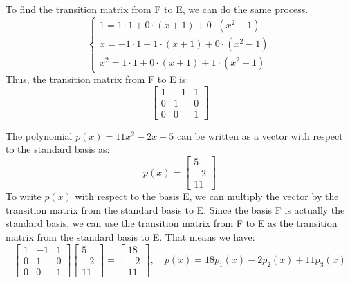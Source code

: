 \documentclass{article}
\begin{document}
\noindent To find the transition matrix from F to E, we can do the same process.
$$
\begin{cases} 1 = 1 \cdot 1 + 0 \cdot (x + 1) + 0 \cdot (x^2 - 1) \\ 
    x = -1 \cdot 1 + 1 \cdot (x + 1) + 0 \cdot (x^2 - 1) \\ 
    x^2 = 1 \cdot 1 + 0 \cdot (x + 1) + 1 \cdot (x^2 - 1)
\end{cases}
$$
Thus, the transition matrix from F to E is:
$$ \begin{bmatrix} 1 & -1 & 1 \\ 0 & 1 & 0 \\ 0 & 0 & 1 \end{bmatrix} $$

\noindent The polynomial $p(x) = 11x^2 - 2x + 5$ can be written as a vector with respect to the standard basis as:
$$ p(x) = \begin{bmatrix} 5 \\ -2 \\ 11 \end{bmatrix} $$
\noindent To write $p(x)$ with respect to the basis E, we can multiply the vector by the transition matrix from the standard basis to E.
Since the basis F is actually the standard basis, we can use the transition matrix from F to E as the transition matrix from the standard basis to E.
That means we have:
$$ 
\begin{bmatrix} 1 & -1 & 1 \\ 0 & 1 & 0 \\ 0 & 0 & 1 \end{bmatrix} 
\begin{bmatrix} 5 \\ -2 \\ 11 \end{bmatrix} = \begin{bmatrix} 18 \\ -2 \\ 11 \end{bmatrix}
, \quad
p(x) = 18 p_1(x) - 2 p_2(x) + 11 p_3(x)
$$
\end{document}
